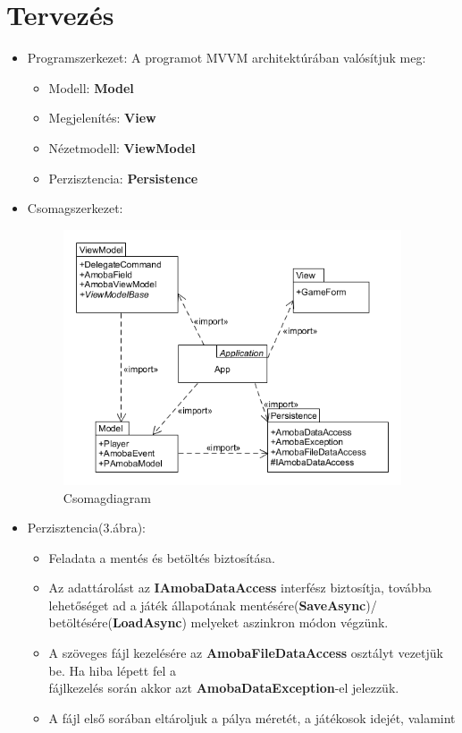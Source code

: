 \documentclass[11pt,a4paper]{article}
\begin{document}
\section{Tervezés}
\begin{itemize}
	\item Programszerkezet: A programot MVVM architektúrában valósítjuk meg:
	\begin{itemize}
		\item Modell: \textbf{Model}
		\item Megjelenítés: \textbf{View}
		\item Nézetmodell: \textbf{ViewModel}
		\item Perzisztencia: \textbf{Persistence}
	\end{itemize}
	\item Csomagszerkezet:
	\begin{figure}[h]
		\centering
		\includegraphics[width=10cm]{UMLs/Package.png}
		\caption{Csomagdiagram}
	\end{figure}
	\item Perzisztencia(3.ábra):
	\begin{itemize}
		\item Feladata a mentés és betöltés biztosítása.
		\item Az adattárolást az \textbf{IAmobaDataAccess} interfész biztosítja, továbba
		lehetőséget ad a játék állapotának mentésére(\textbf{SaveAsync})/
		betöltésére(\textbf{LoadAsync})	melyeket aszinkron módon végzünk.
		\item A szöveges fájl kezelésére az \textbf{AmobaFileDataAccess} osztályt vezetjük be.
		Ha hiba lépett fel a\\fájlkezelés során akkor azt \textbf{AmobaDataException}-el jelezzük.
		\item A fájl első sorában eltároljuk a pálya méretét, a játékosok idejét, valamint

\end{itemize}
\end{itemize}
\end{document}
